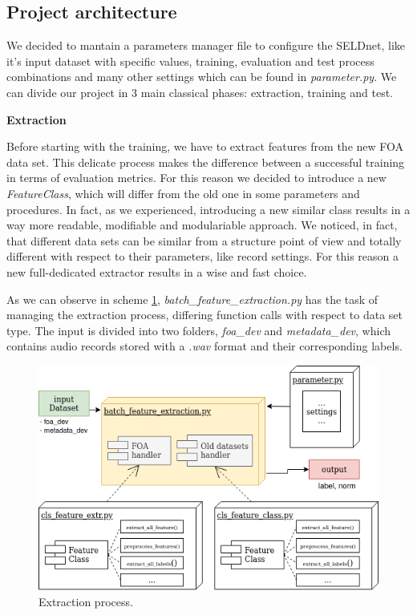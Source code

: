 \documentclass[11pt]{article}
\begin{document}
\subsection{Project architecture}
We decided to mantain a parameters manager file to configure the SELDnet, like it's input dataset with specific values, training, evaluation and test process combinations and many other settings which can be found in \textit{parameter.py}. We can divide our project in 3 main classical phases: extraction, training and test.

\noindent\textbf{Extraction}

Before starting with the training, we have to extract features from the new FOA data set. This delicate process makes the difference between a successful training in terms of evaluation metrics. For this reason we decided to introduce a new \textit{FeatureClass}, which will differ from the old one in some parameters and procedures. In fact, as we experienced, introducing a new similar class results in a way more readable, modifiable and modulariable approach. We noticed, in fact, that different data sets can be similar from a structure point of view and totally different with respect to their parameters, like record settings. For this reason a new full-dedicated extractor results in a wise and fast choice.

As we can observe in scheme \ref{fig:extraction}, \textit{batch\_feature\_extraction.py} has the task of managing the extraction process, differing function calls with respect to data set type. The input is divided into two folders, \textit{foa\_dev} and \textit{metadata\_dev}, which contains audio records stored with a \textit{.wav} format and their corresponding labels.

\begin{figure}[h!]
	\centering
	\includegraphics[width=12.5cm]{img/extraction.png}
	\caption{Extraction process.}
	\label{fig:extraction}
\end{figure}
\end{document}
